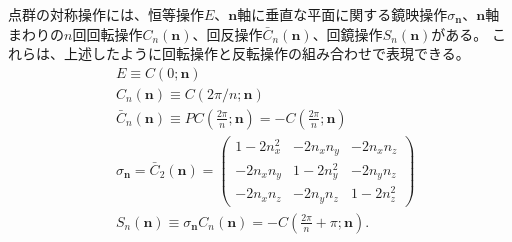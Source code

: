 \documentclass[11pt]{easymemo}
\begin{document}
点群の対称操作には、恒等操作$E$、$\bm{n}$軸に垂直な平面に関する鏡映操作$\sigma_{\bm{n}}$、$\bm{n}$軸まわりの$n$回回転操作$C_{n}(\bm{n})$、回反操作$\bar{C}_{n}(\bm{n})$、回鏡操作$S_{n}(\bm{n})$がある。
これらは、上述したように回転操作と反転操作の組み合わせで表現できる。
\begin{align}
&
E\equiv C(0;\bm{n})
\\&
C_{n}(\bm{n})\equiv C(2\pi/n;\bm{n})
\\&
  \bar{C}_{n}(\bm{n})\equiv PC(\frac{2\pi}{n};\bm{n})=-C(\frac{2\pi}{n};\bm{n})
\\&
  \sigma_{\bm{n}}=\bar{C}_{2}(\bm{n})
  =\begin{pmatrix}
    1-2n_x^2     & -2n_{x}n_{y} & -2n_{x}n_{z} \\
    -2n_{x}n_{y} & 1-2n_y^2     & -2n_{y}n_{z} \\
    -2n_{x}n_{z} & -2n_{y}n_{z} & 1-2n_z^2
  \end{pmatrix}
\\&
  S_{n}(\bm{n})\equiv \sigma_{\bm{n}}C_{n}({\bm{n}})=-C(\frac{2\pi}{n}+\pi;\bm{n}).
\end{align}
\end{document}
